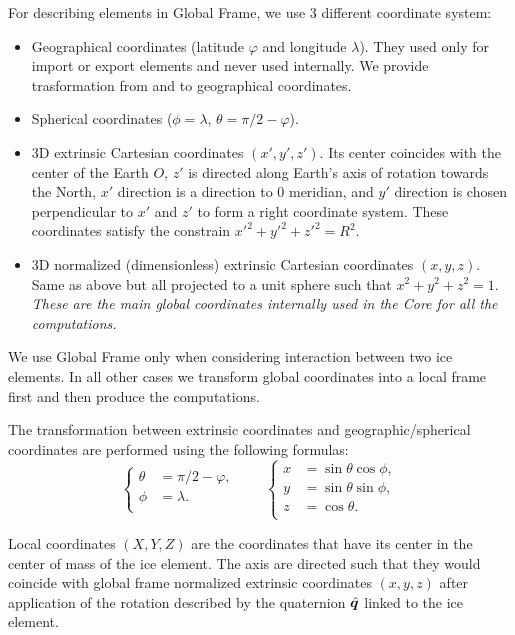 For describing elements in Global Frame, we use 3 different coordinate
system:
\begin{itemize}
\item Geographical coordinates (latitude $\varphi$ and longitude
  $\lambda$). They used only for import or export elements and never
  used internally. We provide trasformation from and to geographical
  coordinates.
\item Spherical coordinates ($\phi=\lambda$, $\theta=\pi/2-\varphi$).
\item 3D extrinsic Cartesian coordinates $(x',y',z')$.  Its center
  coincides with the center of the Earth $O$, $z'$ is directed along
  Earth's axis of rotation towards the North, $x'$ direction is a
  direction to 0 meridian, and $y'$ direction is chosen perpendicular
  to $x'$ and $z'$ to form a right coordinate system. These
  coordinates satisfy the constrain ${x'}^2+{y'}^2+{z'}^2=R^2$.
\item 3D normalized (dimensionless) extrinsic Cartesian coordinates
  $(x,y,z)$. Same as above but all projected to a unit sphere such
  that ${x}^2+{y}^2+{z}^2=1$.  \textit{These are the main global coordinates
  internally used in the Core for all the computations.}
\end{itemize}

We use Global Frame only when considering interaction between two ice
elements. In all other cases we transform global coordinates into a
local frame first and then produce the computations.

The transformation between extrinsic coordinates and
geographic/spherical coordinates are performed using the following
formulas:
\begin{equation}\label{eq:extrinsic}
  \left\{
  \begin{aligned}
    \theta &= \pi/2 - \varphi,\\
    \phi &=\lambda.\\
  \end{aligned}
  \right.\qquad\left\{
  \begin{aligned}
    x &= \sin\theta\cos\phi, \\
    y &= \sin\theta\sin\phi, \\
    z &= \cos\theta.\\
  \end{aligned}
  \right.
\end{equation}

Local coordinates $(X,Y,Z)$ are the coordinates that have its center
in the center of mass of the ice element. The axis are directed such
that they would coincide with global frame normalized extrinsic
coordinates $(x,y,z)$ after application of the rotation described by
the quaternion ${\hat{\bm{q}}}$ linked to the ice element.

